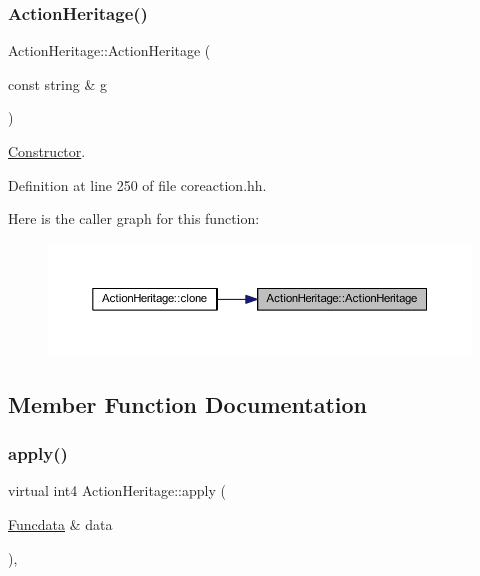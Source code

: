 \subsubsection{\texorpdfstring{ActionHeritage()}{ActionHeritage()}}
{\footnotesize\ttfamily Action\+Heritage\+::\+Action\+Heritage (\begin{DoxyParamCaption}\item[{const string \&}]{g }\end{DoxyParamCaption})\hspace{0.3cm}{\ttfamily [inline]}}



\mbox{\hyperlink{class_constructor}{Constructor}}. 



Definition at line 250 of file coreaction.\+hh.

Here is the caller graph for this function\+:
\nopagebreak
\begin{figure}[H]
\begin{center}
\leavevmode
\includegraphics[width=350pt]{class_action_heritage_adcfa762662965f97aed79d2ed3427550_icgraph}
\end{center}
\end{figure}


\subsection{Member Function Documentation}
\mbox{\label{class_action_heritage_a10a113512ed64008b5c8fb54d4040843}} 
\subsubsection{\texorpdfstring{apply()}{apply()}}
{\footnotesize\ttfamily virtual int4 Action\+Heritage\+::apply (\begin{DoxyParamCaption}\item[{\mbox{\hyperlink{class_funcdata}{Funcdata}} \&}]{data }\end{DoxyParamCaption})\hspace{0.3cm}{\ttfamily [inline]}, {\ttfamily [virtual]}}



